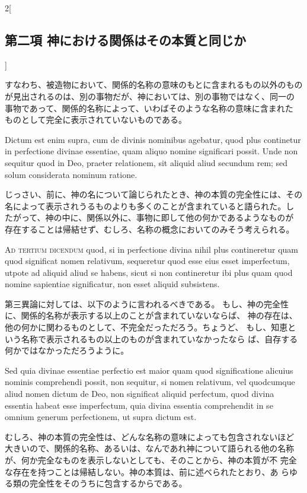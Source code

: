 \documentclass[paper=a4paper,fontsize=10pt,jafontsize=9pt,titlepage]{jlreq}
\begin{document}
\begin{paracol}{2}[\subsection{第二項 神における関係はその本質と同じか}]
\switchcolumn


すなわち、被造物において、関係的名称の意味のもとに含まれるもの以外のもの
 が見出されるのは、別の事物だが、神においては、別の事物ではなく、同一の
 事物であって、関係的名称によって、いわばそのような名称の意味に含まれた
 ものとして完全に表示されていないものである。


\switchcolumn*


Dictum est enim supra, cum de
divinis nominibus agebatur, quod plus continetur in perfectione divinae
essentiae, quam aliquo nomine significari possit. Unde non sequitur quod
in Deo, praeter relationem, sit aliquid aliud secundum rem; sed solum
considerata nominum ratione.


\switchcolumn


じっさい、前に、神の名について論じられたとき、神の本質の完全性には、その
 名によって表示されうるものよりも多くのことが含まれていると語られた。し
 たがって、神の中に、関係以外に、事物に即して他の何かであるようなものが
 存在することは帰結せず、むしろ、名称の概念においてのみそう考えられる。


\switchcolumn*[\subsection{ad.3}]


{\scshape Ad tertium dicendum} quod, si in perfectione divina nihil plus
contineretur quam quod significat nomen relativum, sequeretur quod esse
eius esset imperfectum, utpote ad aliquid aliud se habens, sicut si non
contineretur ibi plus quam quod nomine sapientiae significatur, non
esset aliquid subsistens.


\switchcolumn


第三異論に対しては、以下のように言われるべきである。
もし、神の完全性に、関係的名称が表示する以上のことが含まれていないならば、
 神の存在は、他の何かに関わるものとして、不完全だっただろう。ちょうど、
 もし、知恵という名称で表示されるもの以上のものが含まれていなかったなら
 ば、自存する何かではなかっただろうように。


\switchcolumn*


Sed quia divinae essentiae perfectio est maior
quam quod significatione alicuius nominis comprehendi possit, non
sequitur, si nomen relativum, vel quodcumque aliud nomen dictum de Deo,
non significat aliquid perfectum, quod divina essentia habeat esse
imperfectum, quia divina essentia comprehendit in se omnium generum
perfectionem, ut supra dictum est.


\switchcolumn


むしろ、神の本質の完全性は、どんな名称の意味によっても包含されないほど
 大きいので、関係的名称、あるいは、なんであれ神について語られる他の名称
 が、何か完全なものを表示しないとしても、そのことから、神の本質が不
 完全な存在を持つことは帰結しない。神の本質は、前に述べられたとおり、あ
 らゆる類の完全性をそのうちに包含するからである。


\switchcolumn*



\end{paracol}
\newpage
\end{document}

